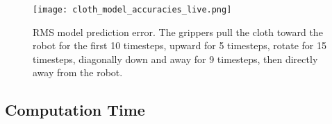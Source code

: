 \begin{figure}[ht]
    \centering
    \texttt{[image: cloth\_model\_accuracies\_live.png]}
    \caption{RMS model prediction error. The grippers pull the cloth toward the robot for the first 10 timesteps, upward for 5 timesteps, rotate for 15 timesteps, diagonally down and away for 9 timesteps, then directly away from the robot.}
    \label{fig:cloth_model_accuracies_live}
\end{figure}

\subsection{Computation Time}

\begin{table}[ht]
\centering
{}
\caption{Top two rows: Mean computation time (ms) per model prediction for a given gripper motion. BT: Bullet simulator; NM: new model. Bottom row: Mean number of times the model was evaluated when executing the controller in Sec.~\ref{sec:stretching_constraint_controller}.}
\label{tbl:simulation_time_report}
\end{table}


